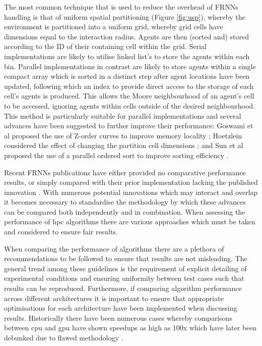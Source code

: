   The most common technique that is used to reduce the overhead of FRNNs handling is that of uniform spatial partitioning (Figure \ref{fig:usp}), whereby the environment is partitioned into a uniform grid, whereby grid cells have dimensions equal to the interaction radius. Agents are then (sorted and) stored according to the ID of their containing cell within the grid. Serial implementations are likely to utilise linked list's to store the agents within each bin. Parallel implementations in contrast are likely to store agents within a single compact array which is sorted in a distinct step after agent locations have been updated, following which an index to provide direct access to the storage of each cell’s agents is produced. This allows the Moore neighbourhood of an agent’s cell to be accessed, ignoring agents within cells outside of the desired neighbourhood. This method is particularly suitable for parallel implementations \cite{Gre10} and several advances have been suggested to further improve their performance: Goswami et al proposed the use of Z-order curves to improve memory locality \cite{GS*10}; Hoetzlein considered the effect of changing the partition cell dimensions \cite{Hoe14}; and Sun et al proposed the use of a parallel ordered sort to improve sorting efficiency \cite{HY*15}.

  Recent FRNNs publications have either provided no comparative performance results, or simply compared with their prior implementation lacking the published innovation \cite{GS*10,Hoe14,HY*15}. With numerous potential innovations which may interact and overlap it becomes necessary to standardise the methodology by which these advances can be compared both independently and in combination. When assessing the performance of \gls{hpc} algorithms there are various approaches which must be taken and considered to ensure fair results.
  
  When comparing the performance of algorithms there are a plethora of recommendations to be followed to ensure that results are not misleading\cite{Bai92}. The general trend among these guidelines is the requirement of explicit detailing of experimental conditions and ensuring uniformity between test cases such that results can be reproduced. Furthermore, if comparing algorithm performance across different architectures it is important to ensure that appropriate optimisations for each architecture have been implemented when discussing results. Historically there have been numerous cases whereby comparisons between \gls{cpu} and \gls{gpu} have shown speedups as high as 100x which have later been debunked due to flawed methodology \cite{LK*10}.

